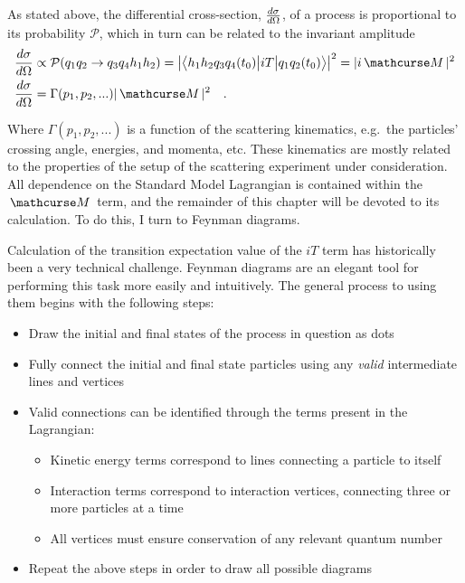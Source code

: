     As stated above, the differential cross-section, $\frac{d \sigma}{d \Omega}$,
        of a process is proportional to its probability $\mathcal{P}$,
        which in turn can be related to the invariant amplitude
    \begin{equation} \begin{split}
        \dXsec &\propto \mathcal{P}( q_{1} q_{2} \rightarrow q_{3} q_{4} h_1 h_2 ) 
            = \left| \TbraketA{ h_1 h_2 q_{3} q_{4} (t_0)}{iT}{q_{1} q_{2} (t_0)} \right|^2 
            = |i \invAmp|^2 
        \\\dXsec &= \Gamma(p_1, p_2, ...) |\invAmp|^2
        \quad.
    \end{split} \end{equation}

    Where $\Gamma(p_1, p_2, ...)$ is a function of the scattering kinematics,
        e.g.\ the particles' crossing angle, energies, and momenta, etc.
    These kinematics are mostly related to the properties of the setup of the scattering experiment under consideration.
    All dependence on the Standard Model Lagrangian is contained within the $\invAmp$ term,
        and the remainder of this chapter will be devoted to its calculation.
    To do this, I turn to Feynman diagrams.

    Calculation of the transition expectation value of the $iT$ term has historically been a very technical challenge.
    Feynman diagrams are an elegant tool for performing this task more easily and intuitively.
    The general process to using them begins with the following steps:
    \begin{itemize}
        \item Draw the initial and final states of the process in question as dots
        \item Fully connect the initial and final state particles using any \textit{valid} intermediate lines and vertices
        \item Valid connections can be identified through the terms present in the Lagrangian:
        \begin{itemize}
            \item Kinetic energy terms correspond to lines connecting a particle to itself
            \item Interaction terms correspond to interaction vertices, connecting three or more particles at a time
            \item All vertices must ensure conservation of any relevant quantum number
        \end{itemize}
        \item Repeat the above steps in order to draw all possible diagrams
    \end{itemize}

